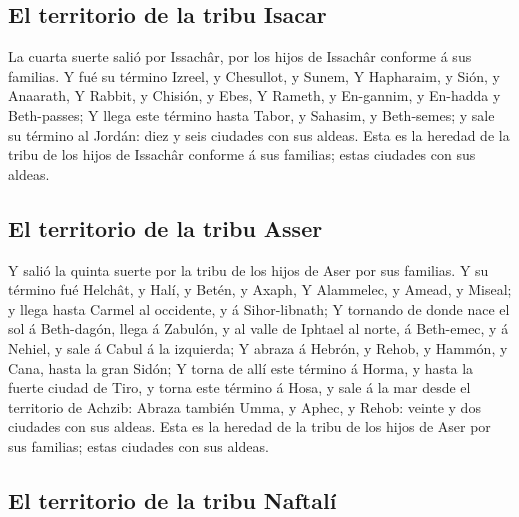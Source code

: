 \hypertarget{el-territorio-de-la-tribu-isacar}{%
\subsection{El territorio de la tribu
Isacar}\label{el-territorio-de-la-tribu-isacar}}

 La cuarta suerte salió por Issachâr, por los hijos de
Issachâr conforme á sus familias.  Y fué su término
Izreel, y Chesullot, y Sunem,  Y Hapharaim, y Sión, y
Anaarath,  Y Rabbit, y Chisión, y Ebes,  Y
Rameth, y En-gannim, y En-hadda y Beth-passes;  Y llega
este término hasta Tabor, y Sahasim, y Beth-semes; y sale su término al
Jordán: diez y seis ciudades con sus aldeas.  Esta es la
heredad de la tribu de los hijos de Issachâr conforme á sus familias;
estas ciudades con sus aldeas.

\hypertarget{el-territorio-de-la-tribu-asser}{%
\subsection{El territorio de la tribu
Asser}\label{el-territorio-de-la-tribu-asser}}

 Y salió la quinta suerte por la tribu de los hijos de
Aser por sus familias.  Y su término fué Helchât, y Halí,
y Betén, y Axaph,  Y Alammelec, y Amead, y Miseal; y
llega hasta Carmel al occidente, y á Sihor-libnath;  Y
tornando de donde nace el sol á Beth-dagón, llega á Zabulón, y al valle
de Iphtael al norte, á Beth-emec, y á Nehiel, y sale á Cabul á la
izquierda;  Y abraza á Hebrón, y Rehob, y Hammón, y Cana,
hasta la gran Sidón;  Y torna de allí este término á
Horma, y hasta la fuerte ciudad de Tiro, y torna este término á Hosa, y
sale á la mar desde el territorio de Achzib:  Abraza
también Umma, y Aphec, y Rehob: veinte y dos ciudades con sus aldeas.
 Esta es la heredad de la tribu de los hijos de Aser por
sus familias; estas ciudades con sus aldeas.

\hypertarget{el-territorio-de-la-tribu-naftaluxed}{%
\subsection{El territorio de la tribu
Naftalí}\label{el-territorio-de-la-tribu-naftaluxed}}

